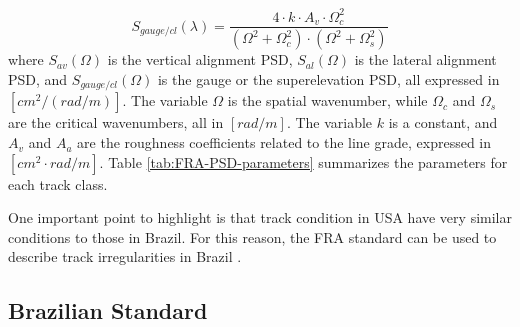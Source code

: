 \begin{equation}
    S_{gauge/cl}(\lambda) = \frac{4 \cdot k \cdot A_v \cdot \Omega_c^2}{\left(\Omega^2 + \Omega_c^2\right) \cdot \left(\Omega^2 + \Omega_s^2\right)}
    \label{eq:FRA-gauge}
\end{equation}
where $S_{av}(\Omega)$ is the vertical alignment PSD, $S_{al}(\Omega)$ is the lateral alignment PSD, and $S_{gauge/cl}(\Omega)$ is the gauge or the superelevation PSD, all expressed in $[cm^2 / (rad/m)]$. The variable $\Omega$ is the spatial wavenumber, while $\Omega_c$ and $\Omega_s$ are the critical wavenumbers, all in $[rad/m]$. The variable $k$ is a constant, and $A_v$ and $A_a$ are the roughness coefficients related to the line grade, expressed in $[cm^2 \cdot rad /m]$. Table \ref{tab:FRA-PSD-parameters} summarizes the parameters for each track class.

\begin{table}[h!]
\centering
{}
\caption{Summary of the parameters for each track class. \cite{PIRES2021107806}}
\label{tab:FRA-PSD-parameters}
\end{table}

One important point to highlight is that track condition in USA have very similar conditions to those in Brazil. For this reason, the FRA standard can be used to describe track irregularities in Brazil \cite{PIRES2021107806}.

\subsection{Brazilian Standard} \label{sec-Brazil-Standard}

